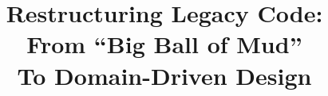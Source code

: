 \documentclass[utf8]{beamer}
\author{~}
\title{Restructuring Legacy Code:\\ From ``Big Ball of Mud''\\ To Domain-Driven Design}
\subtitle{~}
\institute{}
\date{}
\begin{document}
{
	\usebackgroundtemplate{}
	\begin{frame}[t,plain]
		\titlepage
	\end{frame}
}

\end{document}

